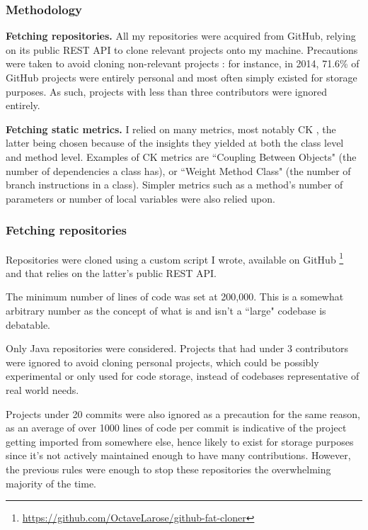 \documentclass[12pt]{article}
\begin{document}
\subsubsection{Methodology}

\noindent
\textbf{Fetching repositories.} All my repositories were acquired from GitHub, relying on its public REST API to clone relevant projects onto my machine. Precautions were taken to avoid cloning non-relevant projects : for instance, in 2014, 71.6\% of GitHub projects were entirely personal \cite{github-mining-perils} and most often simply existed for storage purposes. As such, projects with less than three contributors were ignored entirely.

\medskip
\noindent
\textbf{Fetching static metrics.} I relied on many metrics, most notably CK \cite{ck91}, the latter being chosen because of the insights they yielded at both the class level and method level. Examples of CK metrics are ``Coupling Between Objects" (the number of dependencies a class has), or ``Weight Method Class" (the number of branch instructions in a class). Simpler metrics such as a method's number of parameters or number of local variables were also relied upon.

\subsubsection{Fetching repositories}
Repositories were cloned using a custom script I wrote, available on GitHub \footnote{\url{https://github.com/OctaveLarose/github-fat-cloner}} and that relies on the latter's public REST API.

The minimum number of lines of code was set at 200,000. This is a somewhat arbitrary number as the concept of what is and isn't a ``large" codebase is debatable.

Only Java repositories were considered. Projects that had under 3 contributors were ignored to avoid cloning personal projects, which could be possibly experimental or only used for code storage, instead of codebases representative of real world needs.

Projects under 20 commits were also ignored as a precaution for the same reason, as an average of over 1000 lines of code per commit is indicative of the project getting imported from somewhere else, hence likely to exist for storage purposes since it's not actively maintained enough to have many contributions. However, the previous rules were enough to stop these repositories the overwhelming majority of the time.
\end{document}
